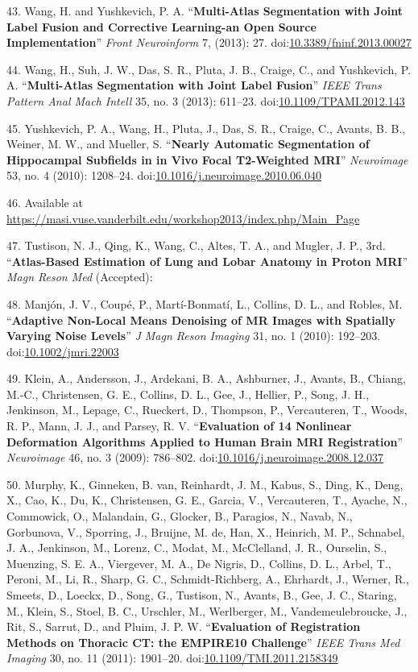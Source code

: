 \documentclass[11pt,]{article}
\begin{document}
43. Wang, H. and Yushkevich, P. A. ``\textbf{Multi-Atlas Segmentation
with Joint Label Fusion and Corrective Learning-an Open Source
Implementation}'' \emph{Front Neuroinform} 7, (2013): 27.
doi:\href{http://dx.doi.org/10.3389/fninf.2013.00027}{10.3389/fninf.2013.00027}

44. Wang, H., Suh, J. W., Das, S. R., Pluta, J. B., Craige, C., and
Yushkevich, P. A. ``\textbf{Multi-Atlas Segmentation with Joint Label
Fusion}'' \emph{IEEE Trans Pattern Anal Mach Intell} 35, no. 3 (2013):
611--23.
doi:\href{http://dx.doi.org/10.1109/TPAMI.2012.143}{10.1109/TPAMI.2012.143}

45. Yushkevich, P. A., Wang, H., Pluta, J., Das, S. R., Craige, C.,
Avants, B. B., Weiner, M. W., and Mueller, S. ``\textbf{Nearly Automatic
Segmentation of Hippocampal Subfields in in Vivo Focal T2-Weighted
MRI}'' \emph{Neuroimage} 53, no. 4 (2010): 1208--24.
doi:\href{http://dx.doi.org/10.1016/j.neuroimage.2010.06.040}{10.1016/j.neuroimage.2010.06.040}

46. Available at
\url{https://masi.vuse.vanderbilt.edu/workshop2013/index.php/Main_Page}

47. Tustison, N. J., Qing, K., Wang, C., Altes, T. A., and Mugler, J.
P., 3rd. ``\textbf{Atlas-Based Estimation of Lung and Lobar Anatomy in
Proton MRI}'' \emph{Magn Reson Med} (Accepted):

48. Manj{ó}n, J. V., Coup{é}, P., Mart{í}-Bonmat{í}, L., Collins, D. L.,
and Robles, M. ``\textbf{Adaptive Non-Local Means Denoising of MR Images
with Spatially Varying Noise Levels}'' \emph{J Magn Reson Imaging} 31,
no. 1 (2010): 192--203.
doi:\href{http://dx.doi.org/10.1002/jmri.22003}{10.1002/jmri.22003}

49. Klein, A., Andersson, J., Ardekani, B. A., Ashburner, J., Avants,
B., Chiang, M.-C., Christensen, G. E., Collins, D. L., Gee, J., Hellier,
P., Song, J. H., Jenkinson, M., Lepage, C., Rueckert, D., Thompson, P.,
Vercauteren, T., Woods, R. P., Mann, J. J., and Parsey, R. V.
``\textbf{Evaluation of 14 Nonlinear Deformation Algorithms Applied to
Human Brain MRI Registration}'' \emph{Neuroimage} 46, no. 3 (2009):
786--802.
doi:\href{http://dx.doi.org/10.1016/j.neuroimage.2008.12.037}{10.1016/j.neuroimage.2008.12.037}

50. Murphy, K., Ginneken, B. van, Reinhardt, J. M., Kabus, S., Ding, K.,
Deng, X., Cao, K., Du, K., Christensen, G. E., Garcia, V., Vercauteren,
T., Ayache, N., Commowick, O., Malandain, G., Glocker, B., Paragios, N.,
Navab, N., Gorbunova, V., Sporring, J., Bruijne, M. de, Han, X.,
Heinrich, M. P., Schnabel, J. A., Jenkinson, M., Lorenz, C., Modat, M.,
McClelland, J. R., Ourselin, S., Muenzing, S. E. A., Viergever, M. A.,
De Nigris, D., Collins, D. L., Arbel, T., Peroni, M., Li, R., Sharp, G.
C., Schmidt-Richberg, A., Ehrhardt, J., Werner, R., Smeets, D., Loeckx,
D., Song, G., Tustison, N., Avants, B., Gee, J. C., Staring, M., Klein,
S., Stoel, B. C., Urschler, M., Werlberger, M., Vandemeulebroucke, J.,
Rit, S., Sarrut, D., and Pluim, J. P. W. ``\textbf{Evaluation of
Registration Methods on Thoracic CT: the EMPIRE10 Challenge}''
\emph{IEEE Trans Med Imaging} 30, no. 11 (2011): 1901--20.
doi:\href{http://dx.doi.org/10.1109/TMI.2011.2158349}{10.1109/TMI.2011.2158349}
\end{document}
